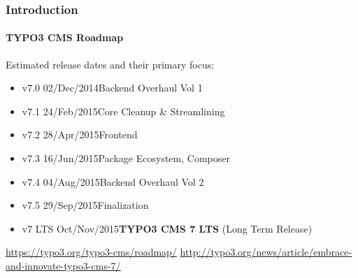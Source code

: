 \begin{frame}[fragile]
	\frametitle{Introduction}
	\framesubtitle{TYPO3 CMS Roadmap}

	Estimated release dates and their primary focus:

	\begin{itemize}
		\item v7.0 \tabto{1.1cm}02/Dec/2014\tabto{3.4cm}Backend Overhaul Vol 1
		\item v7.1 \tabto{1.1cm}24/Feb/2015\tabto{3.4cm}Core Cleanup \& Streamlining
		\item v7.2 \tabto{1.1cm}28/Apr/2015\tabto{3.4cm}Frontend
		\item v7.3 \tabto{1.1cm}16/Jun/2015\tabto{3.4cm}Package Ecosystem, Composer
		\item v7.4 \tabto{1.1cm}04/Aug/2015\tabto{3.4cm}Backend Overhaul Vol 2

		\item
			\begingroup
				\color{typo3orange}
					v7.5 \tabto{1.1cm}29/Sep/2015\tabto{3.4cm}Finalization
			\endgroup

		\item v7 LTS \tabto{1.1cm}Oct/Nov/2015\tabto{3.4cm}\textbf{TYPO3 CMS 7 LTS} (Long Term Release)
	\end{itemize}

	\smaller
		\url{https://typo3.org/typo3-cms/roadmap/}\newline
		\url{http://typo3.org/news/article/embrace-and-innovate-typo3-cms-7/}
	\normalsize

\end{frame}

